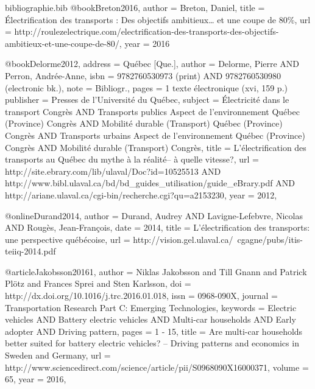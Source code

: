
\begin{filecontents}{bibliographie.bib}
    @book{Breton2016,
        author = {Breton, Daniel},
        title  = {Électrification des transports : Des objectifs ambitieux… et une coupe de 80\%},
        url    = {http://roulezelectrique.com/electrification-des-transports-des-objectifs-ambitieux-et-une-coupe-de-80/},
        year   = {2016}
    }

    @book{Delorme2012,
        address   = {Québec [Que.]},
        author    = {Delorme, Pierre AND Perron, Andrée-Anne},
        isbn      = {9782760530973 (print) AND 9782760530980 (electronic bk.)},
        note      = {Bibliogr.},
        pages     = {1 texte électronique (xvi, 159 p.)}
        publisher = {Presses de l'Université du Québec},
        subject   = {Électricité dans le transport Congrès AND Transports publics Aspect de l'environnement Québec (Province) Congrès AND Mobilité durable (Transport) Québec (Province) Congrès AND Transports urbains Aspect de l'environnement Québec (Province) Congrès AND Mobilité durable (Transport) Congrès},
        title     = {L'électrification des transports au Québec du mythe à la réalité-- à quelle vitesse?},
        url       = {http://site.ebrary.com/lib/ulaval/Doc?id=10525513 AND http://www.bibl.ulaval.ca/bd/bd\_guides\_utilisation/guide\_eBrary.pdf AND http://ariane.ulaval.ca/cgi-bin/recherche.cgi?qu=a2153230},
        year      = {2012},
    }

    @online{Durand2014,
        author = {Durand, Audrey AND Lavigne-Lefebvre, Nicolas AND Rougès, Jean-François},
        date   = {2014},
        title  = {L’électrification des transports: une perspective québécoise},
        url    = {http://vision.gel.ulaval.ca/~cgagne/pubs/itis-teiiq-2014.pdf}
    }

    @article{Jakobsson20161,
        author   = {Niklas Jakobsson and Till Gnann and Patrick Plötz and Frances Sprei and Sten Karlsson},
        doi      = {http://dx.doi.org/10.1016/j.trc.2016.01.018},
        issn     = {0968-090X},
        journal  = {Transportation Research Part C: Emerging Technologies},
        keywords = {Electric vehicles AND Battery electric vehicles AND Multi-car households AND Early adopter AND Driving pattern},
        pages    = {1 - 15},
        title    = {Are multi-car households better suited for battery electric vehicles? – Driving patterns and economics in Sweden and Germany},
        url      = {http://www.sciencedirect.com/science/article/pii/S0968090X16000371},
        volume   = {65},
        year     = {2016},
    }


\end{filecontents}
